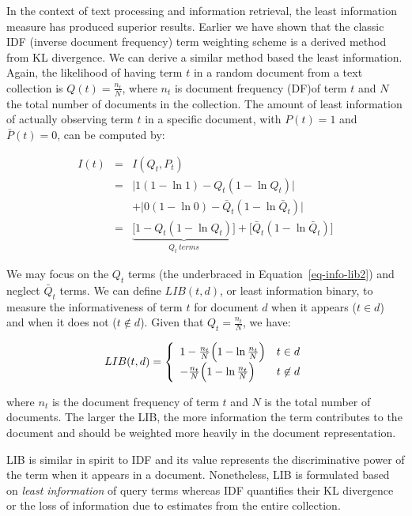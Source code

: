 \documentclass[
  letterpaper,
]{scrbook}
\begin{document}
In the context of text processing and information retrieval, the least
information measure has produced superior results. Earlier we have shown
that the classic IDF (inverse document frequency) term weighting scheme
is a derived method from KL divergence. We can derive a similar method
based the least information. Again, the likelihood of having term \(t\)
in a random document from a text collection is \(Q(t)=\frac{n_t}{N}\),
where \(n_t\) is document frequency (DF)of term \(t\) and \(N\) the
total number of documents in the collection. The amount of least
information of actually observing term \(t\) in a specific document,
with \(P(t)=1\) and \(\bar{P}(t)=0\), can be computed by:

\[\begin{aligned}
  I(t)
  & = & I(Q_t, P_t) \\
  & = & \big| 1 (1 - \ln 1) - Q_t (1 - \ln Q_t) \big| \\
  &   & + \big| 0 (1 - \ln 0) - \bar{Q}_t (1 - \ln \bar{Q}_t) \big| \\
  & = & \underbrace{\big[ 1 - Q_t (1 - \ln Q_t) \big]}_{Q_t\ terms} + \big[ \bar{Q}_t ( 1 - \ln \bar{Q}_t) \big]
\end{aligned}\]

We may focus on the \(Q_t\) terms (the underbraced in
Equation~\hyperref[eq-info-lib2]{{[}eq-info-lib2{]}}) and neglect
\(\bar{Q}_t\) terms. We can define \(LIB(t,d)\), or least information
binary, to measure the informativeness of term \(t\) for document \(d\)
when it appears (\(t \in d\)) and when it does not (\(t \not \in d\)).
Given that \(Q_t = \frac{n_t}{N}\), we have:

\[
LIB(t,d) = \left\{
\begin{array}{l l}
  1 - \frac{n_t}{N} \Big(1 - \ln{\frac{n_t}{N}}\Big)    & t \in d \\
  - \frac{n_t}{N} \Big(1 - \ln \frac{n_t}{N}\Big)       & t \not\in d
\end{array}
\right.
\]

where \(n_t\) is the document frequency of term \(t\) and \(N\) is the
total number of documents. The larger the LIB, the more information the
term contributes to the document and should be weighted more heavily in
the document representation.

LIB is similar in spirit to IDF and its value represents the
discriminative power of the term when it appears in a document.
Nonetheless, LIB is formulated based on \emph{least information} of
query terms whereas IDF quantifies their KL divergence or the loss of
information due to estimates from the entire collection.
\end{document}
